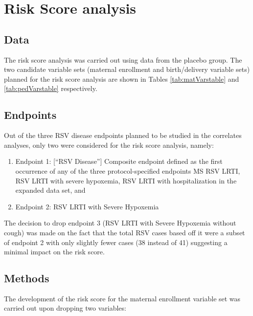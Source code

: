 \documentclass[11pt]{article}
\begin{document}
\hypertarget{risk-score-analysis}{%
\section{Risk Score analysis}\label{risk-score-analysis}}

\hypertarget{data}{%
\subsection{Data}\label{data}}

The risk score analysis was carried out using data from the placebo group. The two candidate variable sets (maternal enrollment and birth/delivery variable sets) planned for the risk score analysis are shown in Tables \ref{tab:matVarstable} and \ref{tab:pedVarstable} respectively.

\hypertarget{endpoints}{%
\subsection{Endpoints}\label{endpoints}}

Out of the three RSV disease endpoints planned to be studied in the correlates analyses, only two were considered for the risk score analysis, namely:

\begin{enumerate}
\def\labelenumi{\arabic{enumi}.}
\item
  Endpoint 1: {[}``RSV Disease''{]} Composite endpoint defined as the first occurrence of any of the
  three protocol-specified endpoints MS RSV LRTI, RSV LRTI with severe
  hypoxemia, RSV LRTI with hospitalization in the expanded data set, and
\item
  Endpoint 2: RSV LRTI with Severe Hypoxemia
\end{enumerate}

The decision to drop endpoint 3 (RSV LRTI with Severe Hypoxemia without cough) was made on the fact that the total RSV cases based off it were a subset of endpoint 2 with only slightly fewer cases (38 instead of 41) suggesting a minimal impact on the risk score.

\hypertarget{methods}{%
\subsection{Methods}\label{methods}}

The development of the risk score for the maternal enrollment variable set was carried out upon dropping two variables:
\end{document}

